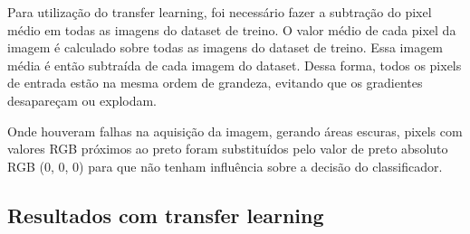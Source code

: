 \documentclass[conference]{IEEEtran}
\begin{document}

  Para utilização do transfer learning, foi necessário fazer a subtração do pixel médio em todas as imagens do dataset de treino. O valor médio de cada pixel da imagem é calculado sobre todas as imagens do dataset de treino. Essa imagem média é então subtraída de cada imagem do dataset. Dessa forma, todos os pixels de entrada estão na mesma ordem de grandeza, evitando que os gradientes desapareçam ou explodam.

  Onde houveram falhas na aquisição da imagem, gerando áreas escuras, pixels com valores RGB próximos ao preto foram substituídos pelo valor de preto absoluto RGB (0, 0, 0) para que não tenham influência sobre a decisão do classificador.

  \subsection{Resultados com transfer learning}

\end{document}

